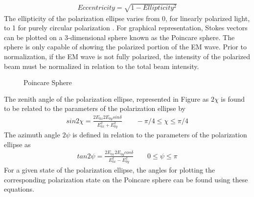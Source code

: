 \begin{align}
    Eccentricity= \sqrt{1-Ellipticity^2}
\end{align}
%
The ellipticity of the polarization ellipse varies from 0, for linearly polarized light, to 1 for purely circular polarization \cite{chipman}.
%
For	graphical representation, Stokes vectors can be plotted on a 3-dimensional sphere known as the Poincare sphere. The sphere is only capable of showing the polarized portion of the EM wave.  Prior to normalization, if the EM wave is not fully polarized, the intensity of the polarized beam must be normalized in relation to the total beam intensity.
%
\begin{figure}[!htb]
    \begin{center}
    \end{center}
    \caption{Poincare Sphere}
    \label{fig:polarization}
\end{figure}

The zenith angle of the polarization ellipse, represented in Figure as $2\chi$ is found to be related to the parameters of the polarization ellipse by
%
\begin{align}
    sin2\chi = \frac{2E_{0x}2E_{0y}sin\delta}{E_{0x}^2+E_{0y}^2}\qquad -\pi / 4 \leq \chi \leq \pi / 4
\end{align}
%
The azimuth angle $2\psi$ is defined in relation to the parameters of the polarization ellipse as
%
\begin{align}
    tan2\psi = \frac{2E_{0x}2E_{0y}cos\delta}{E_{0x}^2-E_{0y}^2}\qquad 0 \leq \psi \leq \pi
\end{align}
%
For a given state of the polarization ellipse, the angles for plotting the corresponding polarization state on the Poincare sphere can be found using these equations\cite{spieellipse}.
